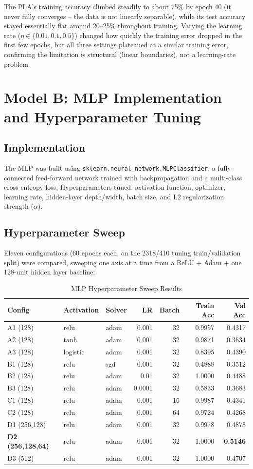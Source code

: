 \documentclass[12pt,a4paper]{article}
\begin{document}
The PLA's training accuracy climbed steadily to about 75\% by epoch 40 (it never fully converges --
the data is not linearly separable), while its test accuracy stayed essentially flat around 20--25\%
throughout training. Varying the learning rate ($\eta \in \{0.01, 0.1, 0.5\}$) changed how quickly the
training error dropped in the first few epochs, but all three settings plateaued at a similar training
error, confirming the limitation is structural (linear boundaries), not a learning-rate problem.

\section{Model B: MLP Implementation and Hyperparameter Tuning}

\subsection{Implementation}
The MLP was built using \texttt{sklearn.neural\_network.MLPClassifier}, a fully-connected feed-forward
network trained with backpropagation and a multi-class cross-entropy loss. Hyperparameters tuned:
activation function, optimizer, learning rate, hidden-layer depth/width, batch size, and L2
regularization strength ($\alpha$).

\subsection{Hyperparameter Sweep}
Eleven configurations (60 epochs each, on the 2318/410 tuning train/validation split) were compared,
sweeping one axis at a time from a ReLU + Adam + one 128-unit hidden layer baseline:

\begin{table}[H]
\centering
\small
\caption{MLP Hyperparameter Sweep Results}
\begin{tabular}{lllrrrr}
\toprule
Config & Activation & Solver & LR & Batch & Train Acc & Val Acc \\
\midrule
A1 (128) & relu & adam & 0.001 & 32 & 0.9957 & 0.4317 \\
A2 (128) & tanh & adam & 0.001 & 32 & 0.9871 & 0.3634 \\
A3 (128) & logistic & adam & 0.001 & 32 & 0.8395 & 0.4390 \\
B1 (128) & relu & sgd & 0.001 & 32 & 0.4888 & 0.3512 \\
B2 (128) & relu & adam & 0.01 & 32 & 1.0000 & 0.4488 \\
B3 (128) & relu & adam & 0.0001 & 32 & 0.5833 & 0.3683 \\
C1 (128) & relu & adam & 0.001 & 16 & 0.9987 & 0.4341 \\
C2 (128) & relu & adam & 0.001 & 64 & 0.9724 & 0.4268 \\
D1 (256,128) & relu & adam & 0.001 & 32 & 0.9978 & 0.4878 \\
\textbf{D2 (256,128,64)} & relu & adam & 0.001 & 32 & 1.0000 & \textbf{0.5146} \\
D3 (512) & relu & adam & 0.001 & 32 & 1.0000 & 0.4707 \\
\bottomrule
\end{tabular}
\end{table}
\end{document}
